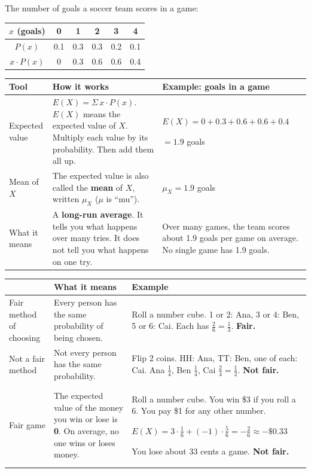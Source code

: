 \documentclass[11pt]{article}
\newcommand{\sumhead}[1]{\par\vspace{0.55em}{\large\bfseries #1}\par\vspace{0.3em}}
\renewcommand{\arraystretch}{1.15}
\newcommand{\disttable}[3][1.25]{{\renewcommand{\arraystretch}{#1}\begin{tabular}{#2}#3\end{tabular}}}
\begin{document}
\sumhead{Expected Value}
The number of goals a soccer team scores in a game: \qquad
\disttable{|c|c|c|c|c|c|}{\hline
$x$ (goals) & 0 & 1 & 2 & 3 & 4\\ \hline
$P(x)$ & 0.1 & 0.3 & 0.3 & 0.2 & 0.1\\ \hline
$x \cdot P(x)$ & 0 & 0.3 & 0.6 & 0.6 & 0.4\\ \hline}

\vspace{0.5em}
\begin{tabular}{|L{1.4in}|L{2.5in}|L{2.55in}|}\hline
\textbf{Tool} & \textbf{How it works} & \textbf{Example: goals in a game}\\ \hline
Expected value & $E(X) = \Sigma\, x \cdot P(x)$. \; $E(X)$ means the expected value of $X$. Multiply each value by its probability. Then add them all up. & $E(X) = 0 + 0.3 + 0.6 + 0.6 + 0.4$\par $= 1.9$ goals\\ \hline
Mean of $X$ & The expected value is also called the \textbf{mean} of $X$, written $\mu_X$ ($\mu$ is ``mu''). & $\mu_X = 1.9$ goals\\ \hline
What it means & A \textbf{long-run average}. It tells you what happens over many tries. It does not tell you what happens on one try. & Over many games, the team scores about 1.9 goals per game on average. No single game has 1.9 goals.\\ \hline
\end{tabular}

\newpage
\sumhead{Fair or Not?}
\begin{tabular}{|L{1.4in}|L{2.5in}|L{2.55in}|}\hline
 & \textbf{What it means} & \textbf{Example}\\ \hline
Fair method of choosing & Every person has the same probability of being chosen. & Roll a number cube. 1 or 2: Ana, 3 or 4: Ben, 5 or 6: Cai. Each has $\frac{2}{6} = \frac{1}{3}$. \textbf{Fair.}\\[0.2em] \hline
Not a fair method & Not every person has the same probability. & Flip 2 coins. HH: Ana, TT: Ben, one of each: Cai. Ana $\frac{1}{4}$, Ben $\frac{1}{4}$, Cai $\frac{2}{4} = \frac{1}{2}$. \textbf{Not fair.}\\[0.2em] \hline
Fair game & The expected value of the money you win or lose is \textbf{0}. On average, no one wins or loses money. & Roll a number cube. You win \$3 if you roll a 6. You pay \$1 for any other number.\par $E(X) = 3 \cdot \frac{1}{6} + (-1) \cdot \frac{5}{6} = -\frac{2}{6} \approx -\$0.33$\par You lose about 33 cents a game. \textbf{Not fair.}\\[0.2em] \hline
\end{tabular}
\end{document}
